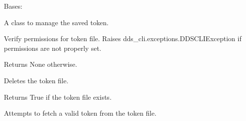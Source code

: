 \documentclass[letterpaper,10pt,english]{sphinxmanual}
\begin{document}
\begin{fulllineitems}
\label{\detokenize{dds_cli:dds_cli.user.TokenFile}}
\sphinxAtStartPar
Bases: 

\sphinxAtStartPar
A class to manage the saved token.

\begin{fulllineitems}
\label{\detokenize{dds_cli:dds_cli.user.TokenFile.check_token_file_permissions}}
\sphinxAtStartPar
Verify permissions for token file. Raises dds\_cli.exceptions.DDSCLIException if
permissions are not properly set.

\sphinxAtStartPar
Returns None otherwise.

\end{fulllineitems}


\begin{fulllineitems}
\label{\detokenize{dds_cli:dds_cli.user.TokenFile.delete_token}}
\sphinxAtStartPar
Deletes the token file.

\end{fulllineitems}


\begin{fulllineitems}
\label{\detokenize{dds_cli:dds_cli.user.TokenFile.file_exists}}
\sphinxAtStartPar
Returns True if the token file exists.

\end{fulllineitems}


\begin{fulllineitems}
\label{\detokenize{dds_cli:dds_cli.user.TokenFile.read_token}}
\sphinxAtStartPar
Attempts to fetch a valid token from the token file.


\end{fulllineitems}
\end{fulllineitems}
\end{document}
